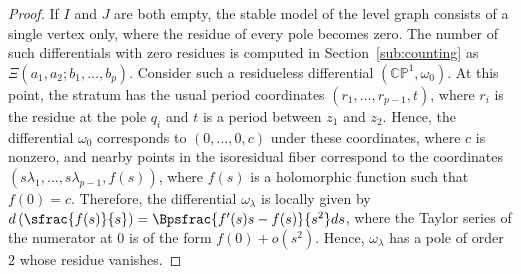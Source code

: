 \begin{proof}
If $I$ and $J$ are both empty, the stable model of the level graph consists of a single vertex only, where the residue of every pole becomes zero. The number of such differentials with zero residues is computed in Section~\ref{sub:counting} as
$\Xi(a_1, a_2; b_1, \ldots, b_p)$. Consider such a residueless differential $(\mathbb{CP}^{1},\omega_{0})$. At this point, the stratum has the usual period coordinates $(r_{1},\dots,r_{p-1},t)$, where $r_{i}$ is the residue at the pole $q_{i}$ and $t$ is a period between $z_{1}$ and $z_{2}$. Hence, the differential $\omega_0$
corresponds to $(0,\dots,0,c)$ under these coordinates, where $c$ is nonzero, and nearby points in the isoresidual fiber correspond to the coordinates $(s\lambda_{1},\dots,s\lambda_{p-1}, f(s))$, where $f(s)$ is a holomorphic function such that $f(0)=c$. Therefore, the differential $\omega_{\lambda}$ is locally given by $d\left(\sfrac{f(s)}{s}\right) = \Bpsfrac{f'(s)s-f(s)}{s^{2}}ds$, where the Taylor series of the numerator at $0$ is of the form $f(0) + o(s^{2})$. Hence, $\omega_\lambda$ has a pole of order $2$ whose residue vanishes.
\end{proof}

